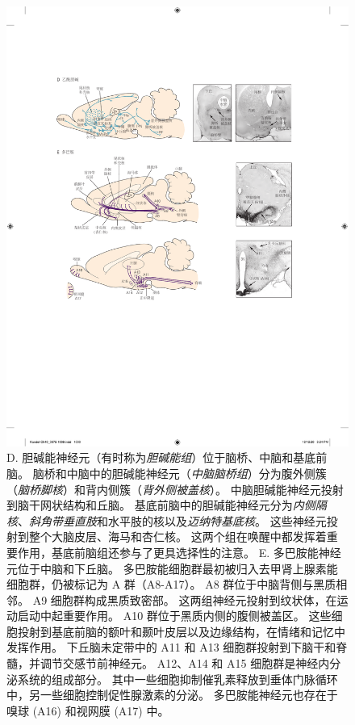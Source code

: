 \begin{figure}[htbp]
	\centering
	\includegraphics[width=1.0\linewidth]{chap40/fig_40_11_de}
	\caption{D. 胆碱能神经元（有时称为\textit{胆碱能组}）位于脑桥、中脑和基底前脑。
		脑桥和中脑中的胆碱能神经元（\textit{中脑脑桥组}）分为腹外侧簇（\textit{脑桥脚核}）和背内侧簇（\textit{背外侧被盖核}）。
		中脑胆碱能神经元投射到脑干网状结构和丘脑。
		基底前脑中的胆碱能神经元分为\textit{内侧隔核}、\textit{斜角带垂直肢}和水平肢的核以及\textit{迈纳特基底核}。
		这些神经元投射到整个大脑皮层、海马和杏仁核。
		这两个组在唤醒中都发挥着重要作用，基底前脑组还参与了更具选择性的注意。
		E. 多巴胺能神经元位于中脑和下丘脑。
		多巴胺能细胞群最初被归入去甲肾上腺素能细胞群，仍被标记为 A 群（A8-A17）。
		A8 群位于中脑背侧与黑质相邻。
		A9 细胞群构成黑质致密部。
		这两组神经元投射到纹状体，在运动启动中起重要作用。
		A10 群位于黑质内侧的腹侧被盖区。
		这些细胞投射到基底前脑的额叶和颞叶皮层以及边缘结构，在情绪和记忆中发挥作用。
		下丘脑未定带中的 A11 和 A13 细胞群投射到下脑干和脊髓，并调节交感节前神经元。
		A12、A14 和 A15 细胞群是神经内分泌系统的组成部分。
		其中一些细胞抑制催乳素释放到垂体门脉循环中，另一些细胞控制促性腺激素的分泌。
		多巴胺能神经元也存在于嗅球 (A16) 和视网膜 (A17) 中。}
	\label{fig:40_11_de}
\end{figure}


